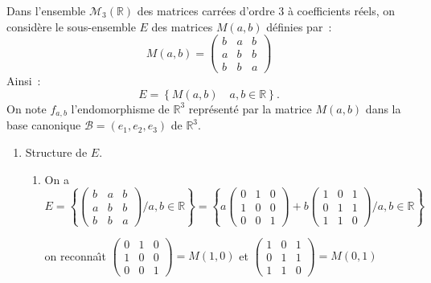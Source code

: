 \begin{correction}

Dans l'ensemble $\mathcal{M}_{3}(\mathbb{R})$ des matrices carr\'{e}es
d'ordre $3$ \`{a} coefficients r\'{e}els, on consid\`{e}re le sous-ensemble $%
E$ des matrices $M(a,b)$ d\'{e}finies par~: 
\begin{equation*}
M(a,b)=\left( 
\begin{array}{rrr}
b & a & b \\ 
a & b & b \\ 
b & b & a%
\end{array}
\right)
\end{equation*}
Ainsi~: 
\begin{equation*}
E=\left\{ M(a,b)\quad a,b\in \mathbb{R}\right\} .
\end{equation*}
On note $f_{a,b}$ l'endomorphisme de $\mathbb{R}^{3}$ repr\'{e}sent\'{e} par
la matrice $M(a,b)$ dans la base canonique $\mathcal{B}=(e_{1},e_{2},e_{3})$
de $\mathbb{R}^{3}$.

\begin{enumerate}
\item Structure de $E$. 
\begin{enumerate}
\item On a $E=\left\{ \left( 
\begin{array}{rrr}
b & a & b \\ 
a & b & b \\ 
b & b & a%
\end{array}
\right) /a,b\in \mathbb{R}\right\} =\left\{ a\left( 
\begin{array}{rrr}
0 & 1 & 0 \\ 
1 & 0 & 0 \\ 
0 & 0 & 1%
\end{array}
\right) +b\left( 
\begin{array}{rrr}
1 & 0 & 1 \\ 
0 & 1 & 1 \\ 
1 & 1 & 0%
\end{array}
\right) /a,b\in \mathbb{R}\right\} $

on reconna\^{\i}t $\left( 
\begin{array}{rrr}
0 & 1 & 0 \\ 
1 & 0 & 0 \\ 
0 & 0 & 1%
\end{array}%
\right) =M\left( 1,0\right) $ et $\left( 
\begin{array}{rrr}
1 & 0 & 1 \\ 
0 & 1 & 1 \\ 
1 & 1 & 0%
\end{array}%
\right) =M\left( 0,1\right) $


\end{enumerate}
\end{enumerate}
\end{correction}
